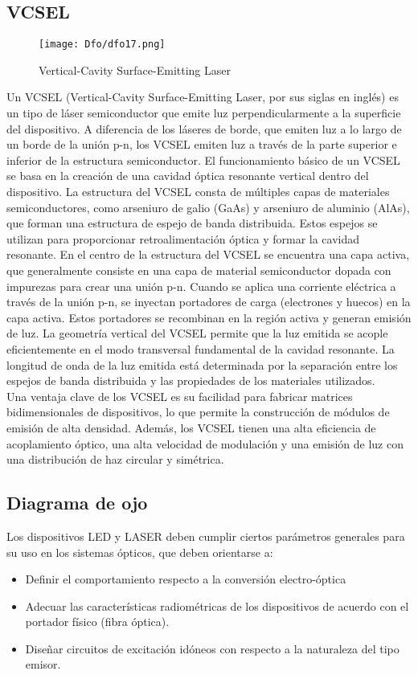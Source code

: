 \documentclass[12pt,fleqn,a4paper,oneside]{LegrandOrangeBook}
\begin{document}
\subsection{VCSEL}
\begin{figure}[H]
\centering
\texttt{[image: Dfo/dfo17.png]}
\caption{Vertical-Cavity Surface-Emitting Laser}
\end{figure}
Un VCSEL (Vertical-Cavity Surface-Emitting Laser, por sus siglas en inglés) es un tipo de láser semiconductor que emite luz perpendicularmente a la superficie del dispositivo. A diferencia de los láseres de borde, que emiten luz a lo largo de un borde de la unión p-n, los VCSEL emiten luz a través de la parte superior e inferior de la estructura semiconductor. El funcionamiento básico de un VCSEL se basa en la creación de una cavidad óptica resonante vertical dentro del dispositivo. La estructura del VCSEL consta de múltiples capas de materiales semiconductores, como arseniuro de galio (GaAs) y arseniuro de aluminio (AlAs), que forman una estructura de espejo de banda distribuida. Estos espejos se utilizan para proporcionar retroalimentación óptica y formar la cavidad resonante. En el centro de la estructura del VCSEL se encuentra una capa activa, que generalmente consiste en una capa de material semiconductor dopada con impurezas para crear una unión p-n. Cuando se aplica una corriente eléctrica a través de la unión p-n, se inyectan portadores de carga (electrones y huecos) en la capa activa. Estos portadores se recombinan en la región activa y generan emisión de luz. La geometría vertical del VCSEL permite que la luz emitida se acople eficientemente en el modo transversal fundamental de la cavidad resonante. La longitud de onda de la luz emitida está determinada por la separación entre los espejos de banda distribuida y las propiedades de los materiales utilizados.\\
Una ventaja clave de los VCSEL es su facilidad para fabricar matrices bidimensionales de dispositivos, lo que permite la construcción de módulos de emisión de alta densidad. Además, los VCSEL tienen una alta eficiencia de acoplamiento óptico, una alta velocidad de modulación y una emisión de luz con una distribución de haz circular y simétrica.
\subsection{Diagrama de ojo}
Los dispositivos LED y LASER deben cumplir ciertos parámetros generales para su uso en los sistemas ópticos, que deben orientarse a:
\begin{itemize}
\item Definir el comportamiento respecto a la conversión electro-óptica
\item Adecuar las características radiométricas de los dispositivos de acuerdo con el portador físico (fibra óptica).
\item Diseñar circuitos de excitación idóneos con respecto a la naturaleza del tipo emisor.
\end{itemize}
\end{document}
